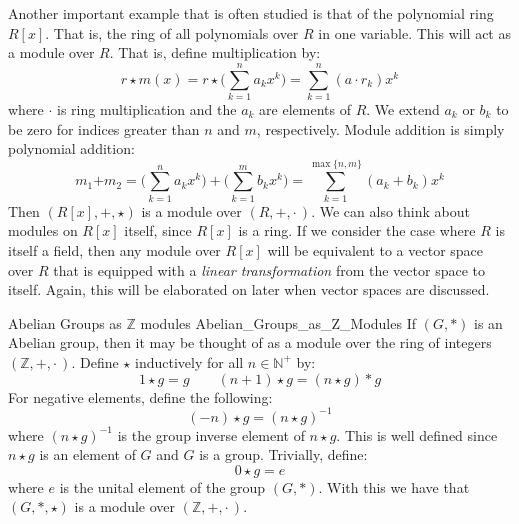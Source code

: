     \begin{example}
        Another important example that is often studied is that of the
        polynomial ring $R[x]$. That is, the ring of all polynomials over $R$ in
        one variable. This will act as a module over $R$. That is, define
        multiplication by:
        \begin{equation}
            r\star{m}(x)
            =r\star\Big(\sum_{k=1}^{n}a_{k}x^{k}\Big)
            =\sum_{k=1}^{n}(a\cdot{r}_{k})x^{k}
        \end{equation}
        where $\cdot$ is ring multiplication and the $a_{k}$ are elements of
        $R$. We extend $a_{k}$ or $b_{k}$ to be zero for indices greater than
        $n$ and $m$, respectively. Module addition is simply polynomial
        addition:
        \begin{equation}
            m_{1}\boldsymbol{+}m_{2}
            =\Big(\sum_{k=1}^{n}a_{k}x^{k}\Big)
                +\Big(\sum_{k=1}^{m}b_{k}x^{k}\Big)
            =\sum_{k=1}^{\max\{n,m\}}(a_{k}+b_{k})x^{k}
        \end{equation}
        Then $(R[x],\boldsymbol{+},\star)$ is a module over $(R,+,\cdot\,)$. We
        can also think about modules on $R[x]$ itself, since $R[x]$ is a ring.
        If we consider the case where $R$ is itself a field, then any module
        over $R[x]$ will be equivalent to a vector space over $R$ that is
        equipped with a \textit{linear transformation} from the vector space to
        itself. Again, this will be elaborated on later when vector spaces are
        discussed.
    \end{example}
    \begin{fexample}{Abelian Groups as $\mathbb{Z}$ modules}
                    {Abelian_Groups_as_Z_Modules}
        If $(G,*)$ is an Abelian group, then it may be thought of as a module
        over the ring of integers $(\mathbb{Z},+,\cdot\,)$. Define $\star$
        inductively for all $n\in\mathbb{N}^{+}$ by:
        \begin{equation}
            1\star{g}=g
            \quad\quad
            (n+1)\star{g}=(n\star{g})*g
        \end{equation}
        For negative elements, define the following:
        \begin{equation}
            (\minus{n})\star{g}=(n\star{g})^{\minus{1}}
        \end{equation}
        where $(n\star{g})^{\minus{1}}$ is the group inverse element of
        $n\star{g}$. This is well defined since $n\star{g}$ is an element of $G$
        and $G$ is a group. Trivially, define:
        \begin{equation}
            0\star{g}=e
        \end{equation}
        where $e$ is the unital element of the group $(G,*)$. With this we have
        that $(G,*,\star)$ is a module over $(\mathbb{Z},+,\cdot\,)$.
    \end{fexample}
